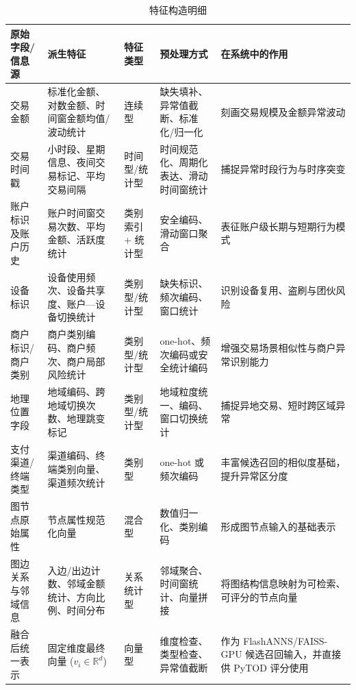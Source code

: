 \begin{table}[htbp]
  \caption{特征构造明细}
  \label{tab:feature-engineering}
  \centering
  \small
  \renewcommand{\arraystretch}{1.2}
  \begin{adjustbox}{max width=\linewidth}
  \begin{tabular}{P{2.8cm}P{4.1cm}P{2.4cm}P{3.2cm}P{4.3cm}}
    \toprule
    原始字段/信息源 & 派生特征 & 特征类型 & 预处理方式 & 在系统中的作用\\
    \midrule
    交易金额 & 标准化金额、对数金额、时间窗金额均值/波动统计 & 连续型 & 缺失填补、异常值截断、标准化/归一化 & 刻画交易规模及金额异常波动\\
    交易时间戳 & 小时段、星期信息、夜间交易标记、平均交易间隔 & 时间型/统计型 & 时间规范化、周期化表达、滑动时间窗统计 & 捕捉异常时段行为与时序突变\\
    账户标识及账户历史 & 账户时间窗交易次数、平均金额、活跃度统计 & 类别索引 + 统计型 & 安全编码、滑动窗口聚合 & 表征账户级长期与短期行为模式\\
    设备标识 & 设备使用频次、设备共享度、账户---设备切换统计 & 类别型/统计型 & 缺失标识、频次编码、窗口统计 & 识别设备复用、盗刷与团伙风险\\
    商户标识/商户类别 & 商户类别编码、商户频次、商户局部风险统计 & 类别型/统计型 & one-hot、频次编码或安全统计编码 & 增强交易场景相似性与商户异常识别能力\\
    地理位置字段 & 地域编码、跨地域切换次数、地理跳变标记 & 类别型/统计型 & 地域粒度统一、编码、窗口切换统计 & 捕捉异地交易、短时跨区域异常\\
    支付渠道/终端类型 & 渠道编码、终端类别向量、渠道频次统计 & 类别型 & one-hot 或频次编码 & 丰富候选召回的相似度基础，提升异常区分度\\
    图节点原始属性 & 节点属性规范化向量 & 混合型 & 数值归一化、类别编码 & 形成图节点输入的基础表示\\
    图边关系与邻域信息 & 入边/出边计数、邻域金额统计、方向比例、时间分布 & 关系统计型 & 邻域聚合、时间窗统计、向量拼接 & 将图结构信息映射为可检索、可评分的节点向量\\
    融合后统一表示 & 固定维度最终向量 ($v_i\in\mathbb{R}^d$) & 向量型 & 维度检查、类型检查、异常值截断 & 作为 FlashANNS/FAISS-GPU 候选召回输入，并直接供 PyTOD 评分使用\\
    \bottomrule
  \end{tabular}
  \end{adjustbox}
\end{table}

\FloatBarrier

